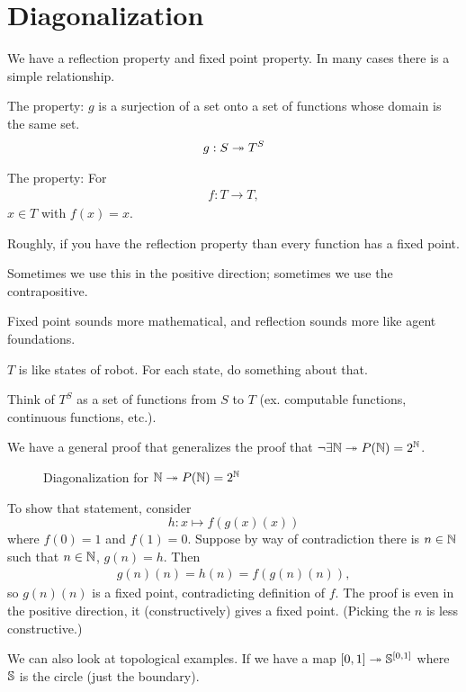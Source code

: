 \documentclass[11pt]{article}
\begin{document}

\section{Diagonalization}

We have a reflection property and fixed point property. In many cases there is a simple relationship.

\begin{df}
The  property: $g$ is a surjection of a set onto a set of functions whose domain is the same set.
\begin{align}
g:S\twoheadrightarrow T^S
\end{align}
\end{df}
\begin{df}
The  property: For 
\begin{align}
f:T\to T,
\end{align}
$x\in T$ with $f(x)=x$.
\end{df}
Roughly, if you have the reflection property than every function has a fixed point.

Sometimes we use this in the positive direction; sometimes we use the contrapositive.

Fixed point sounds more mathematical, and reflection sounds more like agent foundations.

$T$ is like states of robot. For each state, do something about that.

Think of $T^S$ as a set of functions from $S$ to $T$ (ex. computable functions, continuous functions, etc.). 

We have a general proof that generalizes the proof that $\neg \exists \mathbb{N}\twoheadrightarrow P(\mathbb{N}) = 2^{\mathbb{N}}$. 

\begin{figure}
\caption{Diagonalization for $\mathbb{N}\twoheadrightarrow P(\mathbb{N})=2^{\mathbb{N}}$
}
\end{figure}
To show that statement, consider
$$
h: x\mapsto f(g(x)(x))
$$
where $f(0)=1$ and $f(1)=0$. Suppose by way of contradiction there is $n\in \mathbb{N}$ such that $n\in \mathbb{N}$, $g(n)=h$. Then
\begin{align}
g(n)(n)= h(n) = f(g(n)(n)),
\end{align}
so $g(n)(n)$ is a fixed point, contradicting definition of $f$. 
The proof is even in the positive direction, it (constructively) gives a fixed point. (Picking the $n$ is less constructive.)

We can also look at topological examples. If we have a map $[0,1]\twoheadrightarrow \mathbb{S}^{[0,1]}$ where $\mathbb{S}$ is the circle (just the boundary).
\end{document}
